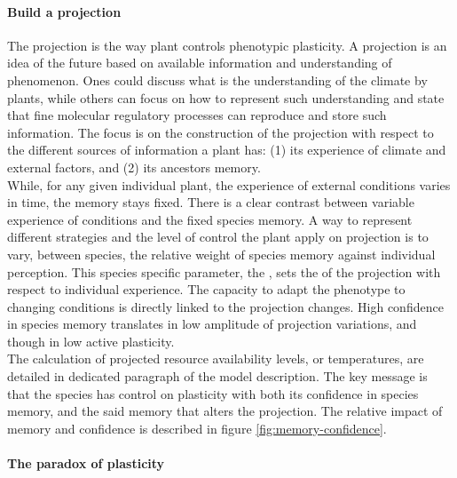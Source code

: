 \paragraph{Build a projection}
The projection is the way plant controls phenotypic plasticity. A projection is an idea of the future based on available information and understanding of phenomenon. Ones could discuss what is the understanding of the climate by plants, while others can focus on how to represent such understanding and state that fine molecular regulatory processes can reproduce and store such information. The focus is on the construction of the projection with respect to the different sources of information a plant has: (1) its experience of climate and external factors, and (2) its ancestors memory.\\
While, for any given individual plant, the experience of external conditions varies in time, the memory stays fixed. There is a clear contrast between variable experience of conditions and the fixed species memory. A way to represent different strategies and the level of control the plant apply on projection is to vary, between species, the relative weight of species memory against individual perception. This species specific parameter, the , sets the  of the projection with respect to individual experience. The capacity to adapt the phenotype to changing conditions is directly linked to the projection changes. High confidence in species memory translates in low amplitude of projection variations, and though in low active plasticity.\\
The calculation of projected resource availability levels, or temperatures, are detailed in dedicated paragraph of the model description. The key message is that the species has control on plasticity with both its confidence in species memory, and the said memory that alters the projection. The relative impact of memory and confidence is described in figure \ref{fig:memory-confidence}.


\paragraph{The paradox of plasticity}

